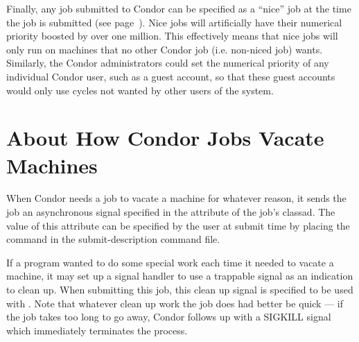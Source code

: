 Finally, any job submitted to Condor can be specified as a ``nice'' job at 
the time the job is submitted (see page~\pageref{man-condor-submit-nice}).
Nice jobs will artificially have their numerical priority boosted by
over one million. This effectively means that nice jobs will only run on
machines that no other Condor job (i.e. non-niced job) wants. Similarly,
the Condor administrators could set the numerical priority of any
individual Condor user, such as a guest account, so that these guest
accounts would only use cycles not wanted by other users of the system.









\section{\label{sec:Vacate-Explained}
About How Condor Jobs Vacate Machines}

When Condor needs a job to vacate a machine for whatever reason, it
sends the job an asynchronous signal specified in the 
attribute of the job's classad.
The value of this attribute can be specified by
the user at submit time by placing the  command in the
 submit-description command file.  

If a program wanted to do some special work each time
it needed to vacate a machine, it may set up a
signal handler to use a trappable signal as an indication
to clean up.
When submitting this job, this clean up signal is specified to be used with
.
Note that whatever clean up work the job does had better be quick
--- if the job takes too long to go away, Condor
follows up with a SIGKILL signal which immediately terminates the
process.

